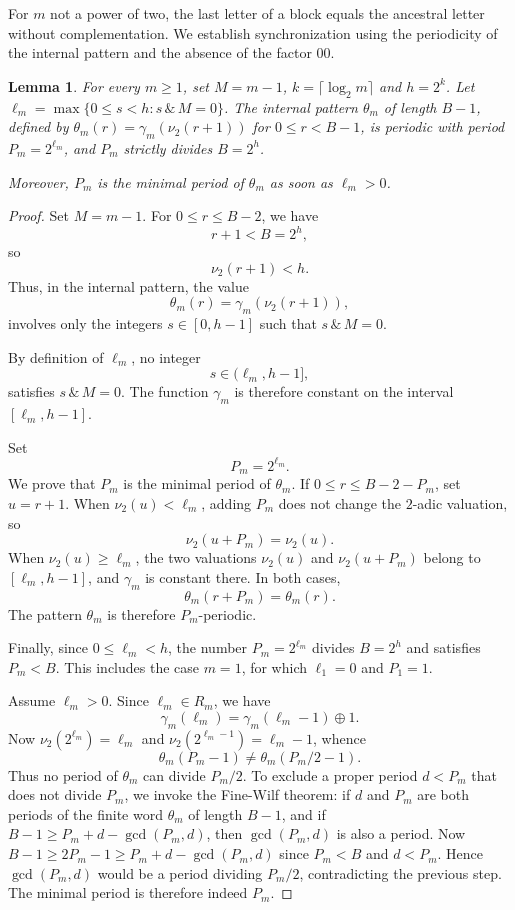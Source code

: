 \documentclass[12pt,reqno]{article}
\theoremstyle{plain}
\newtheorem{lemma}[theorem]{Lemma}
\theoremstyle{definition}
\begin{document}
For $m$ not a power of two, the last letter of a block equals the ancestral letter without complementation. We establish synchronization using the periodicity of the internal pattern and the absence of the factor $00$.

\begin{lemma}
\label{lem:theta-periodicity}
For every $m \ge 1$, set $M = m-1$, $k = \lceil \log_2 m \rceil$ and $h = 2^k$. Let $\ell_m = \max\{0 \le s < h : s \,\&\, M = 0\}$. The internal pattern $\theta_m$ of length $B-1$, defined by $\theta_m(r) = \gamma_m(\nu_2(r+1))$ for $0 \le r < B-1$, is periodic with period $P_m = 2^{\ell_m}$, and $P_m$ strictly divides $B = 2^h$.

Moreover, $P_m$ is the minimal period of $\theta_m$ as soon as $\ell_m > 0$.
\end{lemma}

\begin{proof}
Set $M = m - 1$. For $0 \le r \le B - 2$, we have
\[
  r + 1 < B = 2^h,
\]
so
\[
  \nu_2(r + 1) < h.
\]
Thus, in the internal pattern, the value
\[
  \theta_m(r) = \gamma_m(\nu_2(r + 1)),
\]
involves only the integers $s \in [0, h - 1]$ such that $s \,\&\, M = 0$.

By definition of $\ell_m$, no integer
\[
  s \in (\ell_m, h - 1],
\]
satisfies $s \,\&\, M = 0$. The function $\gamma_m$ is therefore constant on the interval $[\ell_m, h - 1]$.

Set
\[
  P_m = 2^{\ell_m}.
\]
We prove that $P_m$ is the minimal period of $\theta_m$.
If $0 \le r \le B - 2 - P_m$, set $u = r + 1$. When $\nu_2(u) < \ell_m$, adding $P_m$ does not change the $2$-adic valuation, so
\[
  \nu_2(u + P_m) = \nu_2(u).
\]
When $\nu_2(u) \ge \ell_m$, the two valuations $\nu_2(u)$ and $\nu_2(u + P_m)$ belong to $[\ell_m, h - 1]$, and $\gamma_m$ is constant there. In both cases,
\[
  \theta_m(r + P_m) = \theta_m(r).
\]
The pattern $\theta_m$ is therefore $P_m$-periodic.

Finally, since $0 \le \ell_m < h$, the number $P_m = 2^{\ell_m}$ divides $B = 2^h$ and satisfies $P_m < B$. This includes the case $m = 1$, for which $\ell_1 = 0$ and $P_1 = 1$.

Assume $\ell_m > 0$. Since $\ell_m \in R_m$, we have
\[
  \gamma_m(\ell_m) = \gamma_m(\ell_m - 1) \oplus 1.
\]
Now $\nu_2(2^{\ell_m}) = \ell_m$ and $\nu_2(2^{\ell_m - 1}) = \ell_m - 1$, whence
\[
  \theta_m(P_m - 1) \ne \theta_m(P_m/2 - 1).
\]
Thus no period of $\theta_m$ can divide $P_m / 2$. To exclude a proper period $d < P_m$ that does not divide $P_m$, we invoke the Fine-Wilf theorem: if $d$ and $P_m$ are both periods of the finite word $\theta_m$ of length $B - 1$, and if $B - 1 \ge P_m + d - \gcd(P_m, d)$, then $\gcd(P_m, d)$ is also a period. Now $B - 1 \ge 2 P_m - 1 \ge P_m + d - \gcd(P_m, d)$ since $P_m < B$ and $d < P_m$. Hence $\gcd(P_m, d)$ would be a period dividing $P_m / 2$, contradicting the previous step. The minimal period is therefore indeed $P_m$.
\end{proof}
\end{document}

